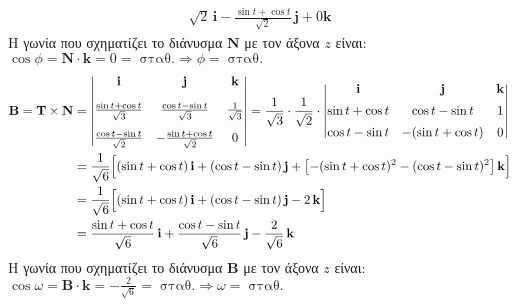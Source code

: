 \documentclass[a4paper,table]{report}
\begin{document}
\begin{solution}
\begin{align*}
{     }{\sqrt{2}} \, \mathbf{i} - \frac{\sin{t} + \cos{t}}{\sqrt{2}} \, \mathbf{j} +0
     \mathbf{k}
   \end{align*}
   Η γωνία που σχηματίζει το διάνυσμα $ \mathbf{N} $ με τον άξονα $z$ είναι: $\cos{\phi} = \mathbf{N}\cdot \mathbf{k} = 0 =\;\text{σταθ.} \Rightarrow \phi =
     \; \text{σταθ.}$ \begin{align*}
     \mathbf{B} = \mathbf{T} \times \mathbf{N} 
     &= \begin{vmatrix*}[c]
       \mathbf{i} & \mathbf{j} & \mathbf{k} \\[10pt]
        \frac{\sin{t} + \cos{t}}{\sqrt{3}} & \frac{\cos{t} - \sin{t}}{\sqrt{3}} &
        \frac{1}{\sqrt{3}} \\[10pt]
        \frac{\cos{t} - \sin{t}}{\sqrt{2}} & - \frac{\sin{t} + \cos{t}}{\sqrt{2}} & 0
      \end{vmatrix*} 
    = \frac{1}{\sqrt{3}} \cdot \frac{1}{\sqrt{2}} \cdot 
    \begin{vmatrix*}[c]
      \mathbf{i} & \mathbf{j} & \mathbf{k} \\[5pt]
      \sin{t} + \cos{t} & \cos{t} - \sin{t} & 1 \\[5pt]
       \cos{t} - \sin{t} & - (\sin{t} + \cos{t}) & 0
     \end{vmatrix*} \\
     &= \frac{1}{\sqrt{6}} \Bigl[(\sin{t} + \cos{t}) \, \mathbf{i} + (\cos{t}-
     \sin{t}) \, \mathbf{j} + \bigl[-(\sin{t} + \cos{t} )^{2}-(\cos{t} - \sin{t} )^{2}\bigr]\,
     \mathbf{k}\Bigr] \\
     &= \frac{1}{\sqrt{6}} \Bigl[(\sin{t} + \cos{t}) \, \mathbf{i} + (\cos{t} - \sin{t}) \,
     \mathbf{j} - 2 \, \mathbf{k}\Bigr] \\
     &= \frac{\sin{t} + \cos{t}}{\sqrt{6}} \, \mathbf{i} + \frac{\cos{t} -
     \sin{t}}{\sqrt{6}} \, \mathbf{j} - \frac{2}{\sqrt{6}} \, \mathbf{k}  
   \end{align*}
   Η γωνία που σχηματίζει το διάνυσμα $ \mathbf{B} $ με τον άξονα $z$ είναι: $\cos{\omega} = \mathbf{B}\cdot \mathbf{k} = - \frac{2}{\sqrt{6}} =\;\text{σταθ.} \Rightarrow \omega =
     \; \text{σταθ.}$ \end{solution}
\end{document}

